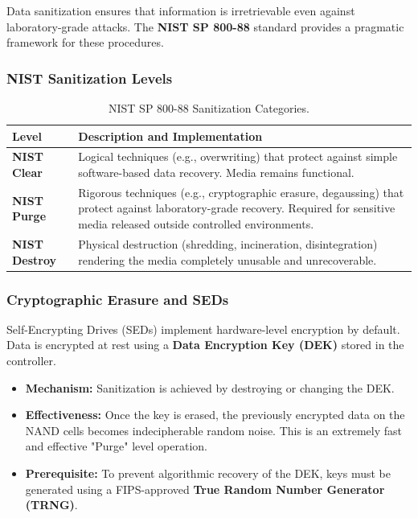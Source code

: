 \noindent
Data sanitization ensures that information is irretrievable even against laboratory-grade attacks. The \textbf{NIST SP 800-88} standard provides a pragmatic framework for these procedures.

\subsubsection*{NIST Sanitization Levels}
\begin{table}[H]
\centering
\small
\begin{tabular}{|l|p{9cm}|}
\hline
\textbf{Level} & \textbf{Description and Implementation} \\
\hline
\textbf{NIST Clear} & Logical techniques (e.g., overwriting) that protect against simple software-based data recovery. Media remains functional. \\
\hline
\textbf{NIST Purge} & Rigorous techniques (e.g., cryptographic erasure, degaussing) that protect against laboratory-grade recovery. Required for sensitive media released outside controlled environments. \\
\hline
\textbf{NIST Destroy} & Physical destruction (shredding, incineration, disintegration) rendering the media completely unusable and unrecoverable. \\
\hline
\end{tabular}
\caption{NIST SP 800-88 Sanitization Categories.}
\end{table}

\subsubsection*{Cryptographic Erasure and SEDs}
Self-Encrypting Drives (SEDs) implement hardware-level encryption by default. Data is encrypted at rest using a \textbf{Data Encryption Key (DEK)} stored in the controller.
\begin{itemize}
    \item \textbf{Mechanism:} Sanitization is achieved by destroying or changing the DEK. 
    \item \textbf{Effectiveness:} Once the key is erased, the previously encrypted data on the NAND cells becomes indecipherable random noise. This is an extremely fast and effective "Purge" level operation.
    \item \textbf{Prerequisite:} To prevent algorithmic recovery of the DEK, keys must be generated using a FIPS-approved \textbf{True Random Number Generator (TRNG)}.
\end{itemize}

